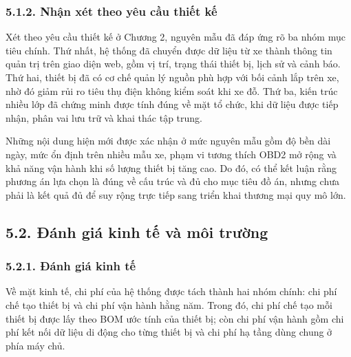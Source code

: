 \documentclass[a4paper]{extarticle}
\begin{document}
\subsubsection{5.1.2. Nhận xét theo yêu cầu thiết kế}\label{nhux1eadn-xuxe9t-theo-yuxeau-cux1ea7u-thiux1ebft-kux1ebf}

Xét theo yêu cầu thiết kế ở Chương 2, nguyên mẫu đã đáp ứng rõ ba nhóm mục tiêu
chính. Thứ nhất, hệ thống đã chuyển được dữ liệu từ xe thành thông tin quản trị
trên giao diện web, gồm vị trí, trạng thái thiết bị, lịch sử và cảnh báo. Thứ
hai, thiết bị đã có cơ chế quản lý nguồn phù hợp với bối cảnh lắp trên xe, nhờ
đó giảm rủi ro tiêu thụ điện không kiểm soát khi xe đỗ. Thứ ba, kiến trúc nhiều
lớp đã chứng minh được tính đúng về mặt tổ chức, khi dữ liệu được tiếp nhận,
phân vai lưu trữ và khai thác tập trung.

Những nội dung hiện mới được xác nhận ở mức nguyên mẫu gồm độ bền dài ngày, mức
ổn định trên nhiều mẫu xe, phạm vi tương thích OBD2 mở rộng và khả năng vận
hành khi số lượng thiết bị tăng cao. Do đó, có thể kết luận rằng phương án lựa
chọn là đúng về cấu trúc và đủ cho mục tiêu đồ án, nhưng chưa phải là kết quả
đủ để suy rộng trực tiếp sang triển khai thương mại quy mô lớn.

\subsection{5.2. Đánh giá kinh tế và môi trường}\label{ux111uxe1nh-giuxe1-kinh-tux1ebf-vuxe0-muxf4i-trux1b0ux1eddng}

\subsubsection{5.2.1. Đánh giá kinh tế}\label{ux111uxe1nh-giuxe1-kinh-tux1ebf}

Về mặt kinh tế, chi phí của hệ thống được tách thành hai nhóm chính: chi phí chế
tạo thiết bị và chi phí vận hành hằng năm. Trong đó, chi phí chế tạo mỗi thiết bị
được lấy theo BOM ước tính của thiết bị; còn chi phí vận hành gồm chi phí kết nối dữ liệu di động
cho từng thiết bị và chi phí hạ tầng dùng chung ở phía máy chủ.
\end{document}
